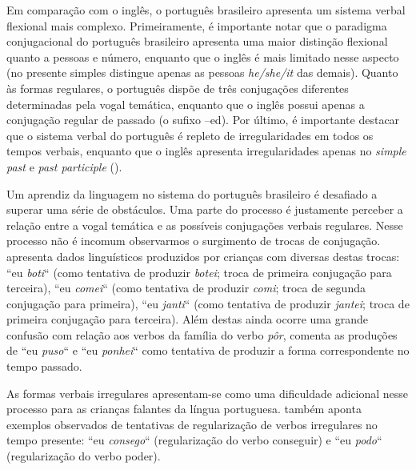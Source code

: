 Em comparação com o inglês, o português brasileiro apresenta um sistema verbal flexional mais complexo. Primeiramente, é importante notar que o paradigma conjugacional do português brasileiro apresenta uma maior distinção flexional quanto a pessoas e número, enquanto que o inglês é mais limitado nesse aspecto (no presente simples distingue apenas as pessoas \textit{he/she/it} das demais). Quanto às formas regulares, o português dispõe de três conjugações diferentes determinadas pela vogal temática, enquanto que o inglês possui apenas a conjugação regular de passado (o sufixo –ed). Por último, é importante destacar que o sistema verbal do português é repleto de irregularidades em todos os tempos verbais, enquanto que o inglês apresenta irregularidades apenas no \textit{simple past} e \textit{past participle} (\cite{wuerges:2014}).

Um aprendiz da linguagem no sistema do português brasileiro é desafiado a superar uma série de obstáculos.  Uma parte do processo é justamente perceber a relação entre a vogal temática e as possíveis conjugações verbais regulares. Nesse processo não é incomum observarmos o surgimento de trocas de conjugação. \cite{wuerges:2014} apresenta dados linguísticos produzidos por crianças com diversas destas trocas: “eu \textit{boti}“ (como tentativa de produzir \textit{botei}; troca de primeira conjugação para terceira), “eu \textit{comei}“ (como tentativa de produzir \textit{comi}; troca de segunda conjugação para primeira), “eu \textit{janti}“ (como tentativa de produzir \textit{jantei}; troca de primeira conjugação para terceira). Além destas ainda ocorre uma grande confusão com relação aos verbos da família do verbo \textit{pôr}, \cite{wuerges:2014} comenta as produções de “eu \textit{puso}“ e “eu \textit{ponhei}“ como tentativa de produzir a forma correspondente no tempo passado.  

As formas verbais irregulares apresentam-se como uma dificuldade adicional nesse processo para as crianças falantes da língua portuguesa. \cite{wuerges:2014} também aponta exemplos observados de tentativas de regularização de verbos irregulares no tempo presente: “eu \textit{consego}“ (regularização do verbo conseguir) e “eu \textit{podo}“ (regularização do verbo poder). 



